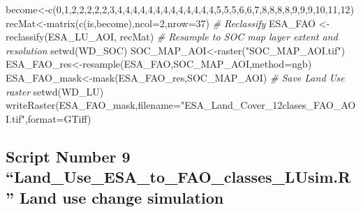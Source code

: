 \documentclass[
  10pt,
  b5paper,
]{book}
\newenvironment{Shaded}{\begin{snugshade}}{\end{snugshade}}
\newcommand{\AttributeTok}[1]{\textcolor[rgb]{0.77,0.63,0.00}{#1}}
\newcommand{\CommentTok}[1]{\textcolor[rgb]{0.56,0.35,0.01}{\textit{#1}}}
\newcommand{\DecValTok}[1]{\textcolor[rgb]{0.00,0.00,0.81}{#1}}
\newcommand{\FunctionTok}[1]{\textcolor[rgb]{0.00,0.00,0.00}{#1}}
\newcommand{\NormalTok}[1]{#1}
\newcommand{\OtherTok}[1]{\textcolor[rgb]{0.56,0.35,0.01}{#1}}
\newcommand{\StringTok}[1]{\textcolor[rgb]{0.31,0.60,0.02}{#1}}
\begin{document}
\begin{Shaded}
\begin{Highlighting}[]
\NormalTok{become}\OtherTok{\textless{}{-}}\FunctionTok{c}\NormalTok{(}\DecValTok{0}\NormalTok{,}\DecValTok{1}\NormalTok{,}\DecValTok{2}\NormalTok{,}\DecValTok{2}\NormalTok{,}\DecValTok{2}\NormalTok{,}\DecValTok{2}\NormalTok{,}\DecValTok{2}\NormalTok{,}\DecValTok{3}\NormalTok{,}\DecValTok{4}\NormalTok{,}\DecValTok{4}\NormalTok{,}\DecValTok{4}\NormalTok{,}\DecValTok{4}\NormalTok{,}\DecValTok{4}\NormalTok{,}\DecValTok{4}\NormalTok{,}\DecValTok{4}\NormalTok{,}\DecValTok{4}\NormalTok{,}\DecValTok{4}\NormalTok{,}\DecValTok{4}\NormalTok{,}\DecValTok{4}\NormalTok{,}\DecValTok{4}\NormalTok{,}\DecValTok{4}\NormalTok{,}\DecValTok{5}\NormalTok{,}\DecValTok{5}\NormalTok{,}\DecValTok{5}\NormalTok{,}\DecValTok{6}\NormalTok{,}\DecValTok{6}\NormalTok{,}\DecValTok{7}\NormalTok{,}\DecValTok{8}\NormalTok{,}\DecValTok{8}\NormalTok{,}\DecValTok{8}\NormalTok{,}\DecValTok{8}\NormalTok{,}\DecValTok{9}\NormalTok{,}\DecValTok{9}\NormalTok{,}\DecValTok{9}\NormalTok{,}\DecValTok{10}\NormalTok{,}\DecValTok{11}\NormalTok{,}\DecValTok{12}\NormalTok{)}
\NormalTok{recMat}\OtherTok{\textless{}{-}}\FunctionTok{matrix}\NormalTok{(}\FunctionTok{c}\NormalTok{(is,become),}\AttributeTok{ncol=}\DecValTok{2}\NormalTok{,}\AttributeTok{nrow=}\DecValTok{37}\NormalTok{)}
\CommentTok{\# Reclassify}
\NormalTok{ESA\_FAO }\OtherTok{\textless{}{-}} \FunctionTok{reclassify}\NormalTok{(ESA\_LU\_AOI, recMat)}
\CommentTok{\# Resample to SOC map layer extent and resolution}
\FunctionTok{setwd}\NormalTok{(WD\_SOC)}
\NormalTok{SOC\_MAP\_AOI}\OtherTok{\textless{}{-}}\FunctionTok{raster}\NormalTok{(}\StringTok{"SOC\_MAP\_AOI.tif"}\NormalTok{)}
\NormalTok{ESA\_FAO\_res}\OtherTok{\textless{}{-}}\FunctionTok{resample}\NormalTok{(ESA\_FAO,SOC\_MAP\_AOI,}\AttributeTok{method=}\StringTok{\textquotesingle{}ngb\textquotesingle{}}\NormalTok{) }
\NormalTok{ESA\_FAO\_mask}\OtherTok{\textless{}{-}}\FunctionTok{mask}\NormalTok{(ESA\_FAO\_res,SOC\_MAP\_AOI) }
\CommentTok{\# Save Land Use raster}
\FunctionTok{setwd}\NormalTok{(WD\_LU)}
\FunctionTok{writeRaster}\NormalTok{(ESA\_FAO\_mask,}\AttributeTok{filename=}\StringTok{"ESA\_Land\_Cover\_12clases\_FAO\_AOI.tif"}\NormalTok{,}\AttributeTok{format=}\StringTok{\textquotesingle{}GTiff\textquotesingle{}}\NormalTok{)}
\end{Highlighting}
\end{Shaded}

\hypertarget{script-number-9-land_use_esa_to_fao_classes_lusim.r-land-use-change-simulation}{%
\subsection{Script Number 9 ``Land\_Use\_ESA\_to\_FAO\_classes\_LUsim.R'' Land use change simulation}\label{script-number-9-land_use_esa_to_fao_classes_lusim.r-land-use-change-simulation}}
\end{document}
